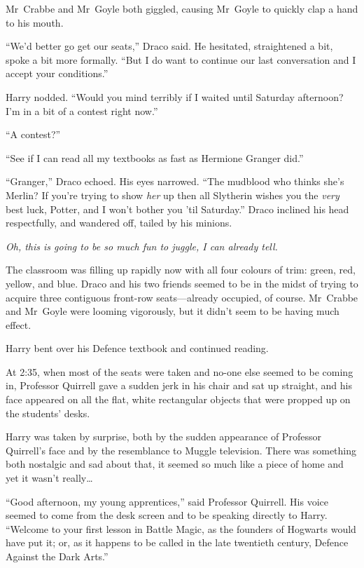 Mr~Crabbe and Mr~Goyle both giggled, causing Mr~Goyle to quickly clap a hand to his mouth.

“We’d better go get our seats,” Draco said. He hesitated, straightened a bit, spoke a bit more formally. “But I do want to continue our last conversation and I accept your conditions.”

Harry nodded. “Would you mind terribly if I waited until Saturday afternoon? I’m in a bit of a contest right now.”

“A contest?”

“See if I can read all my textbooks as fast as Hermione Granger did.”

“Granger,” Draco echoed. His eyes narrowed. “The mudblood who thinks she’s Merlin? If you’re trying to show \emph{her} up then all Slytherin wishes you the \emph{very} best luck, Potter, and I won’t bother you ’til Saturday.” Draco inclined his head respectfully, and wandered off, tailed by his minions.

\emph{Oh, this is going to be \emph{so} much fun to juggle, I can already tell.}

The classroom was filling up rapidly now with all four colours of trim: green, red, yellow, and blue. Draco and his two friends seemed to be in the midst of trying to acquire three contiguous front-row seats—already occupied, of course. Mr~Crabbe and Mr~Goyle were looming vigorously, but it didn’t seem to be having much effect.

Harry bent over his Defence textbook and continued reading.

\later

At 2:35\pm, when most of the seats were taken and no-one else seemed to be coming in, Professor Quirrell gave a sudden jerk in his chair and sat up straight, and his face appeared on all the flat, white rectangular objects that were propped up on the students’ desks.

Harry was taken by surprise, both by the sudden appearance of Professor Quirrell’s face and by the resemblance to Muggle television. There was something both nostalgic and sad about that, it seemed so much like a piece of home and yet it wasn’t really…

“Good afternoon, my young apprentices,” said Professor Quirrell. His voice seemed to come from the desk screen and to be speaking directly to Harry. “Welcome to your first lesson in Battle Magic, as the founders of Hogwarts would have put it; or, as it happens to be called in the late twentieth century, Defence Against the Dark Arts.”

